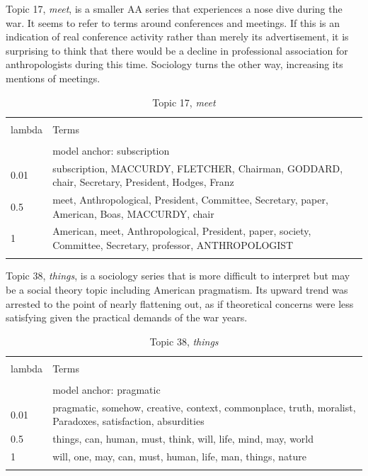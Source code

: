 \documentclass[]{book}
\theoremstyle{definition}
\theoremstyle{definition}
\theoremstyle{definition}
\theoremstyle{remark}
\begin{document}
Topic 17, \emph{meet}, is a smaller AA series that experiences a nose
dive during the war. It seems to refer to terms around conferences and
meetings. If this is an indication of real conference activity rather
than merely its advertisement, it is surprising to think that there
would be a decline in professional association for anthropologists
during this time. Sociology turns the other way, increasing its mentions
of meetings.



\begin{table}[!htbp] \centering 
  \caption{Topic 17, \emph{meet}} 
  \label{tab:t17-h} 
\begin{tabularx}{\textwidth}{@{\extracolsep{5pt}} lY} 
\\[-1.8ex]\hline 
\hline \\[-1.8ex] 
lambda & Terms \\ 
\hline \\[-1.8ex] 
 & model anchor: subscription \\ 
0.01 & subscription, MACCURDY, FLETCHER, Chairman, GODDARD, chair, Secretary, President, Hodges, Franz \\ 
0.5 & meet, Anthropological, President, Committee, Secretary, paper, American, Boas, MACCURDY, chair \\ 
1 & American, meet, Anthropological, President, paper, society, Committee, Secretary, professor, ANTHROPOLOGIST \\ 
\hline \\[-1.8ex] 
\end{tabularx} 
\end{table}

Topic 38, \emph{things}, is a sociology series that is more difficult to
interpret but may be a social theory topic including American
pragmatism. Its upward trend was arrested to the point of nearly
flattening out, as if theoretical concerns were less satisfying given
the practical demands of the war years.



\begin{table}[!htbp] \centering 
  \caption{Topic 38, \emph{things}} 
  \label{tab:t38-h} 
\begin{tabularx}{\textwidth}{@{\extracolsep{5pt}} lY} 
\\[-1.8ex]\hline 
\hline \\[-1.8ex] 
lambda & Terms \\ 
\hline \\[-1.8ex] 
 & model anchor: pragmatic \\ 
0.01 & pragmatic, somehow, creative, context, commonplace, truth, moralist, Paradoxes, satisfaction, absurdities \\ 
0.5 & things, can, human, must, think, will, life, mind, may, world \\ 
1 & will, one, may, can, must, human, life, man, things, nature \\ 
\hline \\[-1.8ex] 
\end{tabularx} 
\end{table}
\end{document}
